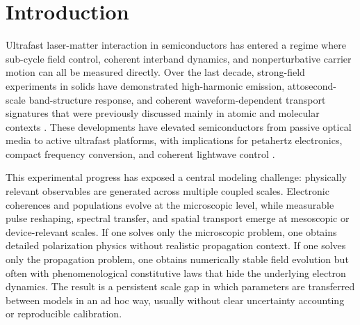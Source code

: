 \documentclass[aps,pra,twocolumn,reprint,superscriptaddress,nofootinbib]{revtex4-2}
\begin{document}
\maketitle

\section{Introduction}
Ultrafast laser-matter interaction in semiconductors has entered a regime where
sub-cycle field control, coherent interband dynamics, and nonperturbative carrier motion can all be measured directly. Over the last decade, strong-field experiments in solids have demonstrated high-harmonic emission, attosecond-scale band-structure response, and coherent waveform-dependent transport signatures that were previously discussed mainly in atomic and molecular contexts \cite{ghimire2011hhg,schubert2014subcycle,schiffrin2013opticalfield,schultze2013controlling,schultze2014attosecond,luu2015extreme,vampa2015linking,hohenleutner2015realtime,garg2016multipetahertz,ndabashimiye2016carrier,you2017anisotropic,yoshikawa2017graphene,sivis2017tailored,higuchi2017lightfield,langer2018lightwave}. These developments have elevated semiconductors from passive optical media to active ultrafast platforms, with implications for petahertz electronics, compact frequency conversion, and coherent lightwave control
\cite{kruchinin2018strong,ghimire2019highharmonicsolids,goulielmakis2022extreme,heide2024ultrafast}.

This experimental progress has exposed a central modeling challenge: physically
relevant observables are generated across multiple coupled scales. Electronic
coherences and populations evolve at the microscopic level, while measurable
pulse reshaping, spectral transfer, and spatial transport emerge at mesoscopic
or device-relevant scales. If one solves only the microscopic problem, one
obtains detailed polarization physics without realistic propagation context. If
one solves only the propagation problem, one obtains numerically stable field
evolution but often with phenomenological constitutive laws that hide the
underlying electron dynamics. The result is a persistent scale gap in which
parameters are transferred between models in an ad hoc way, usually without
clear uncertainty accounting or reproducible calibration.
\end{document}

